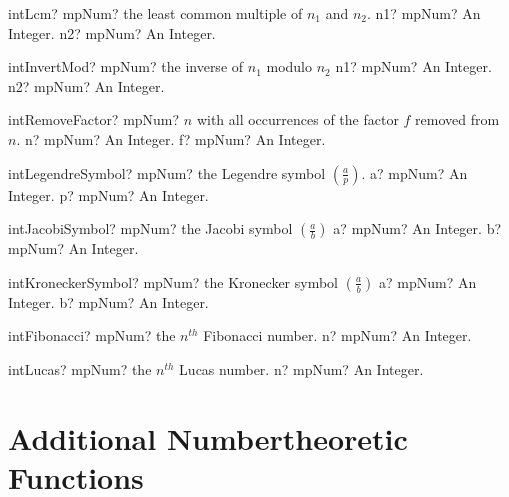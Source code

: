 \documentclass[12pt,a4paper,openany]{book}
\begin{document}
\begin{mpFunctionsExtract}
\mpFunctionTwo
{intLcm? mpNum? the least common multiple of $n_1$ and $n_2$.}
{n1? mpNum? An Integer.}
{n2? mpNum? An Integer.}
\end{mpFunctionsExtract}

\begin{mpFunctionsExtract}
\mpFunctionTwo
{intInvertMod? mpNum? the inverse of $n_1$ modulo $n_2$}
{n1? mpNum? An Integer.}
{n2? mpNum? An Integer.}
\end{mpFunctionsExtract}

\begin{mpFunctionsExtract}
\mpFunctionTwo
{intRemoveFactor? mpNum? $n$ with all occurrences of the factor $f$ removed from $n$.}
{n? mpNum? An Integer.}
{f? mpNum? An Integer.}
\end{mpFunctionsExtract}

\begin{mpFunctionsExtract}
\mpFunctionTwo
{intLegendreSymbol? mpNum? the Legendre symbol $\left(\frac{a}{p}\right)$.}
{a? mpNum? An Integer.}
{p? mpNum? An Integer.}
\end{mpFunctionsExtract}

\begin{mpFunctionsExtract}
\mpFunctionTwo
{intJacobiSymbol? mpNum? the Jacobi symbol $\left(\frac{a}{b}\right)$}
{a? mpNum? An Integer.}
{b? mpNum? An Integer.}
\end{mpFunctionsExtract}

\begin{mpFunctionsExtract}
\mpFunctionTwo
{intKroneckerSymbol? mpNum? the Kronecker symbol $\left(\frac{a}{b}\right)$}
{a? mpNum? An Integer.}
{b? mpNum? An Integer.}
\end{mpFunctionsExtract}

\begin{mpFunctionsExtract}
\mpFunctionOne
{intFibonacci? mpNum? the $n^{th}$ Fibonacci number.}
{n? mpNum? An Integer.}
\end{mpFunctionsExtract}

\begin{mpFunctionsExtract}
\mpFunctionOne
{intLucas? mpNum? the $n^{th}$ Lucas number.}
{n? mpNum? An Integer.}
\end{mpFunctionsExtract}

\section{Additional Numbertheoretic Functions}
\end{document}
